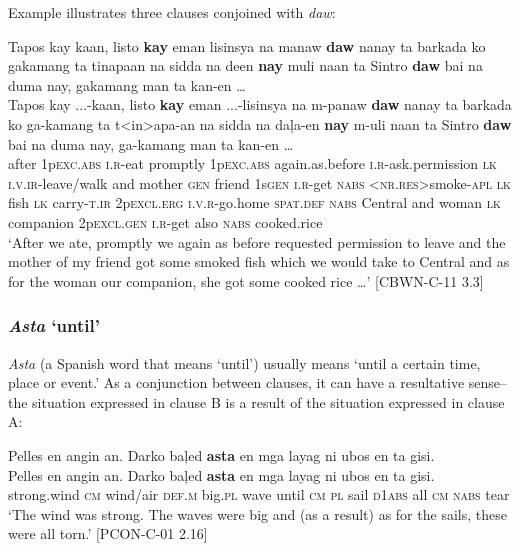 Example  illustrates three clauses conjoined with \textit{daw}: 

\ea
\label{ex:gotsomecookedrice}
Tapos kay kaan, listo \textbf{kay} eman lisinsya na manaw \textbf{daw} nanay ta barkada ko gakamang ta tinapaan na sidda na deen \textbf{nay} muli naan ta Sintro \textbf{daw} bai na duma nay, gakamang man ta kan-en … \\
\vspace{4pt} \gll Tapos kay ...-kaan, listo \textbf{kay} eman ...-lisinsya na m-panaw \textbf{daw} nanay ta barkada ko ga-kamang ta t<in>apa-an na sidda na da\c{l}a-en \textbf{nay} m-uli naan ta Sintro \textbf{daw} bai na duma nay, ga-kamang man ta kan-en … \\
after 1p\textsc{exc.abs} \textsc{i.r}-eat promptly  1p\textsc{exc.abs} again.as.before \textsc{i.r}-ask.permission \textsc{lk} \textsc{i.v.ir}-leave/walk and mother \textsc{gen} friend 1s\textsc{gen} \textsc{i.r}-get \textsc{nabs} <\textsc{nr.res}>smoke-\textsc{apl} \textsc{lk} fish \textsc{lk} carry-\textsc{t.ir} 2p\textsc{excl.erg} \textsc{i.v.r}-go.home \textsc{spat.def} \textsc{nabs} Central  and woman \textsc{lk} companion 2p\textsc{excl.gen} \textsc{i.r}-get also \textsc{nabs} cooked.rice \\
\glt ‘After we ate, promptly we again as before requested permission to leave  and the mother of my friend got some smoked fish which we would take to Central and as for the woman our companion, she got some cooked rice …’ [CBWN-C-11 3.3]
\z

\subsubsection{\textit{Asta} ‘until’}
\label{sec:asta}
\textit{Asta} (a Spanish word that means ‘until’) usually means ‘until a certain time, place or event.’  As a conjunction between clauses, it can have a resultative sense--the situation expressed in clause B is a result of the situation expressed in clause A:

\ea
Pelles en angin an. Darko ba\c{l}ed \textbf{asta} en mga layag ni ubos en ta gisi. \\
\vspace{4pt} \gll Pelles en angin an. Darko ba\c{l}ed \textbf{asta} en mga layag ni ubos en ta gisi. \\
strong.wind \textsc{cm} wind/air \textsc{def.m} big.\textsc{pl} wave until \textsc{cm} \textsc{pl} sail \textsc{d1abs} all \textsc{cm} \textsc{nabs} tear \\
\glt ‘The wind was strong. The waves were big and (as a result) as for the sails, these were all torn.’ [PCON-C-01 2.16]
\z
 
